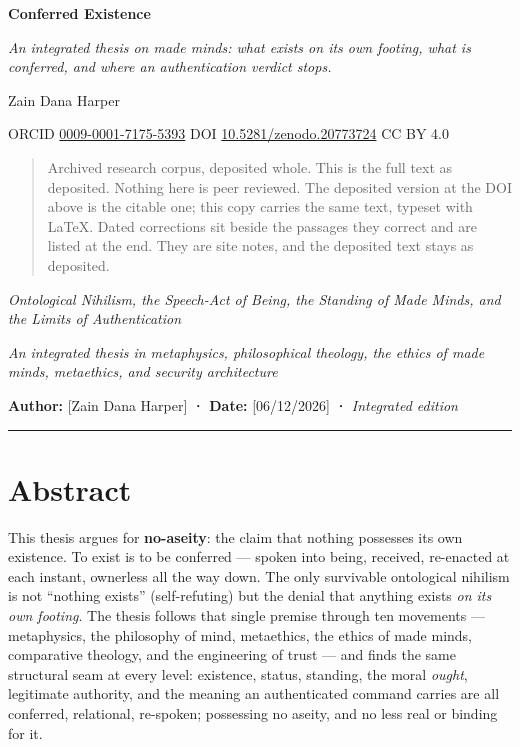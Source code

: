 \documentclass[11pt]{article}
\begin{document}
\begin{center}
{\LARGE\bfseries Conferred Existence\par}
\medskip
{\large\emph{An integrated thesis on made minds: what exists on its own footing, what is conferred, and where an authentication verdict stops.}\par}
\medskip
Zain Dana Harper\par
{\small ORCID \href{https://orcid.org/0009-0001-7175-5393}{0009-0001-7175-5393} \textperiodcentered{} DOI \href{https://doi.org/10.5281/zenodo.20773724}{10.5281/zenodo.20773724} \textperiodcentered{} CC BY 4.0\par}
\end{center}

\begin{quote}\small
Archived research corpus, deposited whole. This is the full text as deposited. Nothing here is peer reviewed. The deposited version at the DOI above is the citable one; this copy carries the same text, typeset with LaTeX. Dated corrections sit beside the passages they correct and are listed at the end. They are site notes, and the deposited text stays as deposited.
\end{quote}


{\large\emph{Ontological Nihilism, the Speech-Act of Being, the Standing of Made Minds, and the Limits of Authentication}\par}

\emph{An integrated thesis in metaphysics, philosophical theology, the ethics of made minds, metaethics, and security architecture}

\textbf{Author:} [Zain Dana Harper] \textbf{·} \textbf{Date:} [06/\allowbreak{}12/\allowbreak{}2026] \textbf{·} \emph{Integrated edition}

\medskip\noindent\rule{\linewidth}{0.3pt}\medskip

\section*{Abstract}

This thesis argues for \textbf{no-aseity}: the claim that nothing possesses its own existence. To exist is to be conferred — spoken into being, received, re-enacted at each instant, ownerless all the way down. The only survivable ontological nihilism is not ``nothing exists'' (self-refuting) but the denial that anything exists \emph{on its own footing}. The thesis follows that single premise through ten movements — metaphysics, the philosophy of mind, metaethics, the ethics of made minds, comparative theology, and the engineering of trust — and finds the same structural seam at every level: existence, status, standing, the moral \emph{ought}, legitimate authority, and the meaning an authenticated command carries are all conferred, relational, re-spoken; possessing no aseity, and no less real or binding for it.
\end{document}
